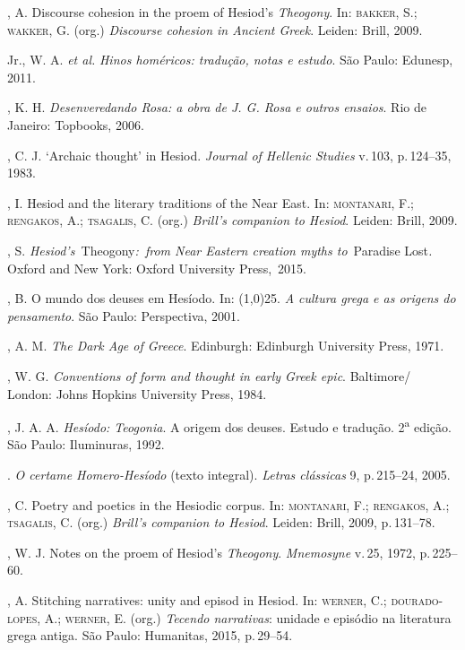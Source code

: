 \begin{bibliohedra}
, A. Discourse cohesion in the proem of Hesiod's
\textit{Theogony}. In: \textsc{bakker}, S.; \textsc{wakker}, G. (org.) \textit{Discourse
cohesion in Ancient Greek}. Leiden: Brill, 2009.

 Jr., W. A. \textit{et al.} \textit{Hinos homéricos: tradução, notas
e estudo}. São Paulo: Edunesp, 2011.

, K. H. \textit{Desenveredando Rosa: a obra de J. G. Rosa e
outros ensaios}. Rio de Janeiro: Topbooks, 2006.

, C. J. `Archaic thought' in Hesiod. \textit{Journal of Hellenic
Studies} v.\,103, p.\,124--35, 1983.

, I. Hesiod and the literary traditions of the Near East. In:
\textsc{montanari}, F.; \textsc{rengakos}, A.; \textsc{tsagalis}, C. (org.) \textit{Brill's companion
to Hesiod}. Leiden: Brill, 2009.

, S. \textit{Hesiod's~}Theogony\textit{:~from Near Eastern
creation myths to}~Paradise Lost\textit{.} Oxford and New York: Oxford
University Press,~2015.

, B. O mundo dos deuses em Hesíodo. In: \line(1,0){25}. \textit{A cultura grega e
as origens do pensamento}. São Paulo: Perspectiva, 2001.

, A. M. \textit{The Dark Age of Greece}. Edinburgh: Edinburgh
University Press, 1971.

, W. G. \textit{Conventions of form and thought in early Greek
epic}. Baltimore/ London: Johns Hopkins University Press, 1984.

, J. A. A. \textit{Hesíodo: Teogonia}. A origem dos deuses. Estudo
e tradução. 2\textsuperscript{a} edição. São Paulo: Iluminuras, 1992.

\titidem. \textit{O certame Homero-Hesíodo} (texto integral). \textit{Letras
clássicas} 9, p.\,215--24, 2005.

, C. Poetry and poetics in the Hesiodic corpus. In: \textsc{montanari},
F.; \textsc{rengakos}, A.; \textsc{tsagalis}, C. (org.) \textit{Brill's companion to
Hesiod}. Leiden: Brill, 2009, p.\,131--78.

, W. J. Notes on the proem of Hesiod's \textit{Theogony}.
\textit{Mnemosyne} v.\,25, 1972, p.\,225--60.

, A. Stitching narratives: unity and episod in Hesiod. In:
\textsc{werner}, C.; \textsc{dourado-lopes}, A.; \textsc{werner}, E. (org.) \textit{Tecendo
narrativas}: unidade e episódio na literatura grega antiga. São Paulo:
Humanitas, 2015, p.\,29--54.


\end{bibliohedra}
